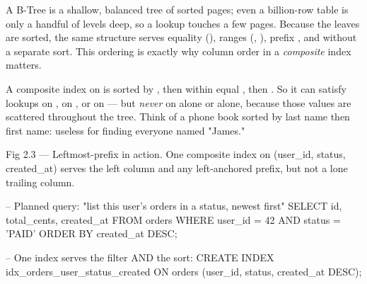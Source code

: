  A B-Tree is a shallow, balanced tree of sorted pages; even a billion-row table is only a handful of levels deep, so a lookup touches a few pages. Because the leaves are sorted, the same structure serves equality (\code{=}), ranges (\code{>}, ), prefix , and  without a separate sort. This ordering is exactly why column order in a \emph{composite} index matters.

 A composite index on  is sorted by , then  within equal , then . So it can satisfy lookups on , on , or on  --- but \emph{never} on  alone or  alone, because those values are scattered throughout the tree. Think of a phone book sorted by last name then first name: useless for finding everyone named "James."

\begin{wbfigure}{Fig 2.3 — Leftmost-prefix in action. One composite index on (user\_id, status, created\_at) serves the left column and any left-anchored prefix, but not a lone trailing column.}
\end{wbfigure}

\begin{sqlbox}
-- Planned query: "list this user's orders in a status, newest first"
SELECT id, total_cents, created_at
FROM orders
WHERE user_id = 42 AND status = 'PAID'
ORDER BY created_at DESC;

-- One index serves the filter AND the sort:
CREATE INDEX idx_orders_user_status_created
  ON orders (user_id, status, created_at DESC);
\end{sqlbox}

